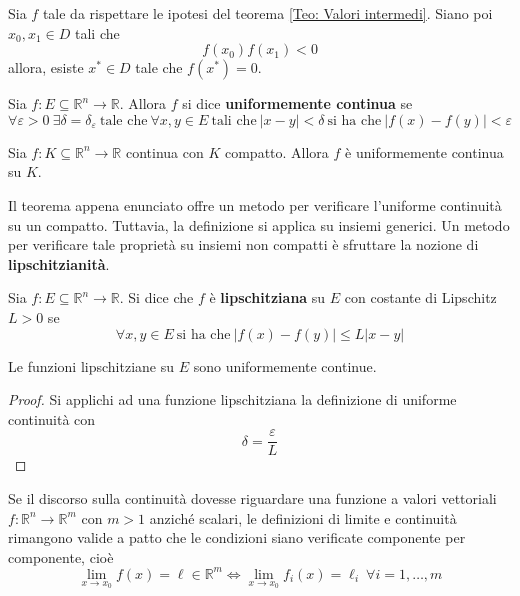 \begin{corollary} \label{Teo: Teorema degli zeri}
    Sia $f$ tale da rispettare le ipotesi del teorema \ref{Teo: Valori intermedi}. Siano poi $x_0, x_1 \in D$ tali che 
    \begin{equation}
        f(x_0)f(x_1) < 0
    \end{equation}
    allora, esiste $x^* \in D$ tale che $f(x^*)=0$.
\end{corollary}
\begin{definition} \label{Def: Uniforme continuità}
    Sia $f:E \subseteq \mathbb{R}^n \to \mathbb{R}$. Allora $f$ si dice \textbf{uniformemente continua} se
    \begin{equation}
        \forall \varepsilon >0 \ \exists \delta=\delta_\varepsilon\ \text{tale che}\ \forall x, y \in E\ \text{tali che}\ |x-y|<\delta\ \text{si ha che}\ |f(x)-f(y)| < \varepsilon
    \end{equation}
\end{definition}
\begin{theorem} \label{Teo: Heine Cantor}
    Sia $f: K \subseteq \mathbb{R}^n \to \mathbb{R}$ continua con $K$ compatto. Allora $f$ è uniformemente continua su $K$.
\end{theorem}
Il teorema appena enunciato offre un metodo per verificare l'uniforme continuità su un compatto. Tuttavia, la definizione si applica su insiemi generici. Un metodo per verificare tale proprietà su insiemi non compatti è sfruttare la nozione di \textbf{lipschitzianità}.
\begin{definition}
    Sia $f:E \subseteq \mathbb{R}^n \to \mathbb{R}$. Si dice che $f$ è \textbf{lipschitziana} su $E$ con costante di Lipschitz $L>0$ se
    \begin{equation}
        \forall x,y \in E\ \text{si ha che}\ |f(x)-f(y)| \leq L|x-y|
    \end{equation}
\end{definition}
\begin{proposition}
    Le funzioni lipschitziane su $E$ sono uniformemente continue.
    \begin{proof}
        Si applichi ad una funzione lipschitziana la definizione di uniforme continuità con 
        \begin{equation}
            \delta= \frac{\varepsilon}{L}
        \end{equation}
    \end{proof}
\end{proposition}
Se il discorso sulla continuità dovesse riguardare una funzione a valori vettoriali $f: \mathbb{R}^n \to \mathbb{R}^m$ con $m>1$ anziché scalari, le definizioni di limite e continuità rimangono valide a patto che le condizioni siano verificate componente per componente, cioè
\begin{equation}
    \lim_{x \to x_0}{f(x)}=\ell \in \mathbb{R}^m \iff \lim_{x \to x_0}{f_i(x)}=\ell_i\ \forall i=1, \dots, m
\end{equation}
